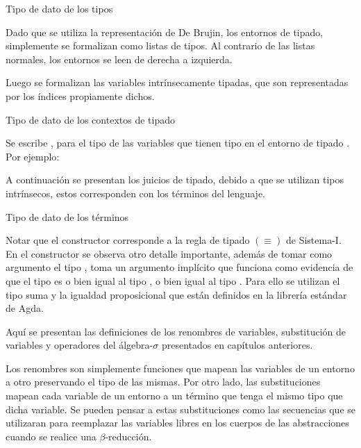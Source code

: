 \documentclass[]{report}
\begin{document}
	\begin{codigo}
		Tipo de dato de los tipos
		
	\end{codigo}
	
	Dado que se utiliza la representación de De Brujin, los entornos de tipado, simplemente se formalizan como listas de tipos.
	Al contrario de las listas normales, los entornos se leen de derecha a izquierda.
	
	Luego se formalizan las variables intrínsecamente tipadas, que son representadas por los índices propiamente dichos.
	
	\begin{codigo}
		Tipo de dato de los contextos de tipado
	\end{codigo}
	
	Se escribe \AgdaBound{$\Gamma$} \AgdaInductiveConstructor{$\ni$} , para el tipo de las variables que tienen tipo  en el entorno de tipado \AgdaBound{$\Gamma$}.
	Por ejemplo: 
	
	\ExecuteMetaData[code/context.tex]{example}
	
	A continuación se presentan los juicios de tipado, debido a que se utilizan tipos intrínsecos, estos corresponden con los términos del lenguaje.
	
	\begin{codigo}
		Tipo de dato de los términos
		
	\end{codigo}
	
	Notar que el constructor \AgdaInductiveConstructor{$[\_]\equiv\_$} corresponde a la regla de tipado $(\equiv)$ de Sistema-I.
	En el constructor \AgdaInductiveConstructor{$\pi$} se observa otro detalle importante, además de tomar como argumento el tipo , toma un argumento implícito que funciona como evidencia de que el tipo  es o bien igual al tipo , o bien igual al tipo . Para ello se utilizan el tipo suma y la igualdad proposicional que están definidos en la librería estándar de Agda.
	
	
	Aquí se presentan las definiciones de los renombres de variables, substitución de variables y operadores del álgebra-$\sigma$ presentados en capítulos anteriores.
	
	
	Los renombres son simplemente funciones que mapean las variables de un entorno a otro preservando el tipo de las mismas.
	Por otro lado, las substituciones mapean cada variable de un entorno a un término que tenga el mismo tipo que dicha variable.
	Se pueden pensar a estas substituciones como las secuencias que se utilizaran para reemplazar las variables libres en los cuerpos de las abstracciones cuando se realice una $\beta$-reducción. 
	
\end{document}
